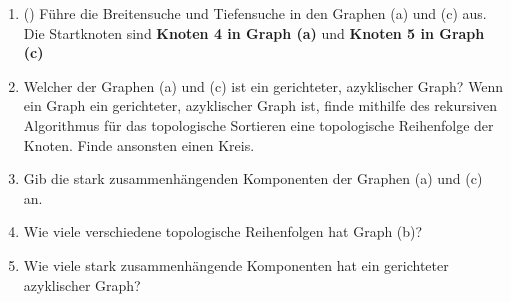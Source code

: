 \documentclass{uebung_cs}
\begin{document}
\begin{aufgabe}
\begin{enumerate}
		\item (\warmup) Führe die Breitensuche und Tiefensuche in den Graphen (a) und (c) aus.
		Die Startknoten sind \textbf{Knoten 4 in Graph (a)} und \textbf{Knoten 5 in Graph (c)}
		\item Welcher der Graphen (a) und (c) ist ein gerichteter, azyklischer Graph?
		Wenn ein Graph ein gerichteter, azyklischer Graph ist, finde mithilfe des rekursiven Algorithmus für das topologische Sortieren eine topologische Reihenfolge der Knoten.
		Finde ansonsten einen Kreis.
		\item Gib die stark zusammenhängenden Komponenten der Graphen (a) und (c) an.
		\item Wie viele verschiedene topologische Reihenfolgen hat Graph (b)?
		\item Wie viele stark zusammenhängende Komponenten hat ein gerichteter azyklischer Graph?
	\end{enumerate}
\end{aufgabe}
\end{document}
